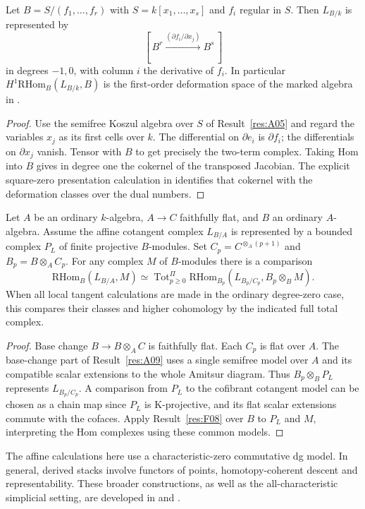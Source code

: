 \begin{example}\label{res:A11}
Let \(B=S/(f_1,\ldots,f_r)\) with \(S=k[x_1,\ldots,x_s]\) and
\(f_i\) regular in \(S\). Then \(L_{B/k}\) is represented by
\[
    [\,B^r\xrightarrow{(\partial f_i/\partial x_j)}B^s\,]
\]
in degrees \(-1,0\), with column \(i\) the derivative of \(f_i\).
In particular \(H^1\mathrm{RHom}_B(L_{B/k},B)\) is the first-order
deformation space of the marked algebra in
\cite[T04]{ca-topics}.
\end{example}
\begin{proof}
Use the semifree Koszul algebra over \(S\) of Result~\ref{res:A05}
and regard the variables \(x_j\) as its first cells over \(k\).
The differential on \(\partial e_i\) is \(\partial f_i\);
the differentials on \(\partial x_j\) vanish. Tensor with \(B\)
to get precisely the two-term complex.
Taking Hom into \(B\) gives in degree one the cokernel of
the transposed Jacobian. The explicit square-zero presentation
calculation in \cite[T02--T04]{ca-topics} identifies that cokernel
with the deformation classes over the dual numbers.
\end{proof}

\begin{proposition}\label{res:A12}
Let \(A\) be an ordinary \(k\)-algebra, \(A\to C\) faithfully
flat, and \(B\) an ordinary \(A\)-algebra. Assume the affine
cotangent complex \(L_{B/A}\) is represented by a bounded complex
\(P_L\) of finite projective \(B\)-modules. Set
\(C_p=C^{\otimes_A(p+1)}\) and \(B_p=B\otimes_A C_p\).
For any complex \(M\) of \(B\)-modules there is a comparison
\[
 \mathrm{RHom}_B(L_{B/A},M)
 \simeq \operatorname{Tot}^{\Pi}_{p\geq0}
     \mathrm{RHom}_{B_p}(L_{B_p/C_p}, B_p\otimes_B M).
\]
When all local tangent calculations are made in the ordinary
degree-zero case, this compares their classes and higher
cohomology by the indicated full total complex.
\end{proposition}
\begin{proof}
Base change \(B\to B\otimes_A C\) is faithfully flat.
Each \(C_p\) is flat over \(A\). The base-change part of
Result~\ref{res:A09} uses a single semifree model over \(A\)
and its compatible scalar extensions to the whole Amitsur diagram.
Thus \(B_p\otimes_B P_L\) represents \(L_{B_p/C_p}\).
A comparison from \(P_L\) to the cofibrant cotangent model can
be chosen as a chain map since \(P_L\) is K-projective, and its
flat scalar extensions commute with the cofaces. Apply
Result~\ref{res:F08} over \(B\) to \(P_L\) and \(M\), interpreting
the Hom complexes using these common models.
\end{proof}

The affine calculations here use a characteristic-zero commutative
dg model. In general, derived stacks involve functors of points,
homotopy-coherent descent and representability. These broader
constructions, as well as the all-characteristic simplicial
setting, are developed in \cite[\S\S1.2.12 and 2.2.3]{hag} and
\cite[\S\S2 and 4]{toen}.
